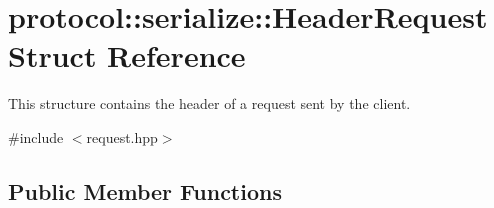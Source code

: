 \hypertarget{structprotocol_1_1serialize_1_1_header_request}{}\section{protocol\+:\+:serialize\+:\+:Header\+Request Struct Reference}
\label{structprotocol_1_1serialize_1_1_header_request}


This structure contains the header of a request sent by the client.  




{\ttfamily \#include $<$request.\+hpp$>$}

\subsection*{Public Member Functions}

